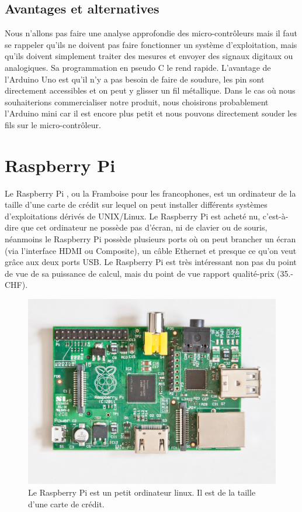 \documentclass[a4paper,11pt]{report}
\begin{document}
{\subsection{Avantages et alternatives}
Nous n'allons pas faire une analyse approfondie des micro-contrôleurs mais il faut se rappeler qu'ils ne doivent pas faire fonctionner un système d'exploitation, mais qu'ils doivent simplement traiter des mesures et envoyer des signaux digitaux ou analogiques. Sa programmation en pseudo C le rend rapide. L'avantage de l'Arduino Uno est qu'il n'y a pas besoin de faire de soudure, les pin sont directement accessibles et on peut y glisser un fil métallique. Dans le cas où nous souhaiterions commercialiser notre produit, nous choisirons probablement l'Arduino mini car il est encore plus petit et nous pouvons directement souder les fils sur le micro-contrôleur.

\section{Raspberry Pi}
Le Raspberry Pi \cite{RaspberryPiCaracteristiques}, ou la Framboise pour les francophones, est un ordinateur de la taille d'une carte de crédit sur lequel on peut installer différents systèmes d'exploitations dérivés de UNIX/Linux. Le Raspberry Pi est acheté nu, c'est-à-dire que cet ordinateur ne possède pas d'écran, ni de clavier ou de souris, néanmoins le Raspberry Pi possède plusieurs ports où on peut brancher un écran (via l'interface HDMI ou Composite), un câble Ethernet et presque ce qu'on veut grâce aux deux ports USB. Le Raspberry Pi est très intéressant non pas du point de vue de sa puissance de calcul, mais du point de vue rapport qualité-prix (35.- CHF).

\begin{figure}[h]
\includegraphics[width = 1.0\textwidth]{raspberrypi.jpg}
\caption[Raspberry Pi]{\label{RaspberryPi} Le Raspberry Pi est un petit ordinateur linux. Il est de la taille d'une carte de crédit.}
\end{figure}

}
\end{document}
